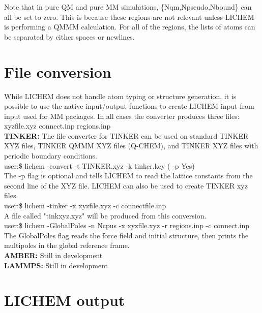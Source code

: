\documentclass[12pt]{report}
\begin{document}
Note that in pure QM and pure MM simulations, \{Nqm,Npseudo,Nbound\} can all
be set to zero. This is because these regions are not relevant unless LICHEM is
performing a QMMM calculation. For all of the regions, the lists of atoms can
be separated by either spaces or newlines.

\section{File conversion}

While LICHEM does not handle atom typing or structure generation, it is
possible to use the native input/output functions to create LICHEM input from
input used for MM packages. In all cases the converter produces three
files: xyzfile.xyz connect.inp regions.inp \\

{\textbf{TINKER:}} The file converter for TINKER can be used on standard
TINKER XYZ files, TINKER QMMM XYZ files (Q-CHEM), and TINKER XYZ files
with periodic boundary conditions. \\

user:\$ lichem -convert -t TINKER.xyz -k tinker.key ( -p Yes) \\

The -p flag is optional and tells LICHEM to read the lattice constants from
the second line of the XYZ file. LICHEM can also be used to create TINKER xyz
files. \\

user:\$ lichem -tinker -x xyzfile.xyz -c connectfile.inp \\

A file called "tinkxyz.xyz" will be produced from this conversion. \\

user:\$ lichem -GlobalPoles -n Ncpus -x xyzfile.xyz -r regions.inp 
 -c connect.inp \\

The GlobalPoles flag reads the force field and initial structure, then prints
the multipoles in the global reference frame. \\

{\textbf{AMBER:}} {\color{red}Still in development} \\

{\textbf{LAMMPS:}} {\color{red}Still in development}

\section{LICHEM output}
\end{document}
